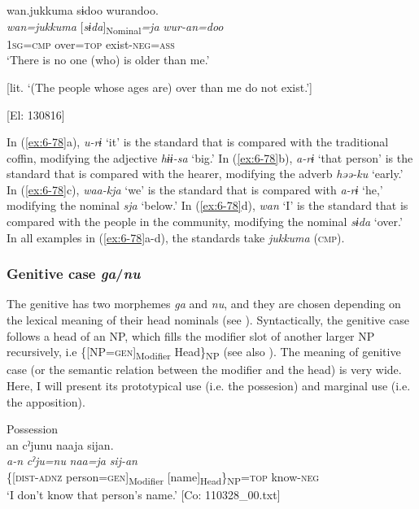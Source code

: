 \begin{table}
      [Co: 110328\_00.txt]
\z

\ex {\TM}  wan.jukkuma  sɨdoo  wurandoo.\\
\glll \textit{wan=jukkuma}  [\textit{sɨda}]\textsubscript{Nominal}\textit{=ja}  \textit{wur-an=doo}\\
1\textsc{sg}=\textsc{cmp}  over=\textsc{top}  exist-\textsc{neg}=\textsc{ass}\\
\glt ‘There is no one (who) is older than me.’

[lit. ‘(The people whose ages are) over than me do not exist.’]

      [El: 130816]

In (\ref{ex:6-78}a), \textit{u-rɨ} ‘it’ is the standard that is compared with the traditional coffin, modifying the adjective \textit{hɨɨ-sa} ‘big.’ In (\ref{ex:6-78}b), \textit{a-rɨ} ‘that person’ is the standard that is compared with the hearer, modifying the adverb \textit{həə-ku} ‘early.’ In (\ref{ex:6-78}c), \textit{waa-kja} ‘we’ is the standard that is compared with \textit{a-rɨ} ‘he,’ modifying the nominal \textit{sja} ‘below.’ In (\ref{ex:6-78}d), \textit{wan} ‘I’ is the standard that is compared with the people in the community, modifying the nominal \textit{sɨda} ‘over.’ In all examples in (\ref{ex:6-78}a-d), the standards take \textit{jukkuma} (\textsc{cmp}).

\subsubsection{ Genitive case \textit{ga}/\textit{nu}}

The genitive has two morphemes \textit{ga} and \textit{nu}, and they are chosen depending on the lexical meaning of their head nominals (see ). Syntactically, the genitive case follows a head of an NP, which fills the modifier slot of another larger NP recursively, i.e \{[NP=\textsc{gen}]\textsubscript{Modifier} Head\}\textsubscript{NP} (see also ). The meaning of genitive case (or the semantic relation between the modifier and the head) is very wide. Here, I will present its prototypical use (i.e. the possesion) and marginal use (i.e. the apposition).

\ea\label{ex:6-79}
\ea Possession\\
{\TM}
\glll  an  cˀjunu  naaja  sijan.\\
\textit{a-n}  \textit{cˀju=nu}  \textit{naa=ja}  \textit{sij-an}\\
\{[\textsc{dist}-\textsc{adnz}  person=\textsc{gen}]\textsubscript{Modifier}  [name]\textsubscript{Head}\}\textsubscript{NP}=\textsc{top}  know-\textsc{neg}\\
\glt ‘I don’t know that person’s name.’ [Co: 110328\_00.txt]
\z


\end{table}
